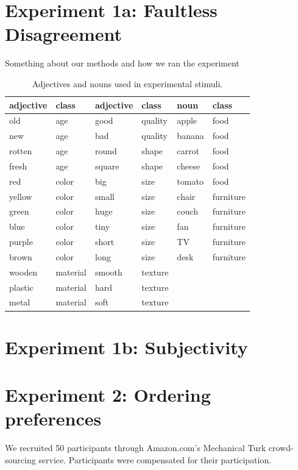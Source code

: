 \documentclass{pnastwo}
\begin{document}
\begin{article}
\begin{materials}
\section{Experiment 1a: Faultless Disagreement}
Something about our methods and how we ran the experiment
\begin{table}[h]
	\caption{Adjectives and nouns used in experimental stimuli.}
	\begin{tabular}{@{\vrule height 10.5pt depth2pt  width0pt}llllll}
	\textbf{adjective}	&	\textbf{class}	&	\textbf{adjective}	&	\textbf{class}	&	\textbf{noun}	&	\textbf{class}	\\ \hline
old	&	age	&	good	&	quality	&	apple	&	food	\\
new	&	age	&	bad	&	quality	&	banana	&	food	\\
rotten	&	age	&	round	&	shape	&	carrot	&	food	\\
fresh	&	age	&	square	&	shape	&	cheese	&	food	\\
red	&	color	&	big	&	size	&	tomato	&	food	\\
yellow	&	color	&	small	&	size	&	chair	&	furniture	\\
green	&	color	&	huge	&	size	&	couch	&	furniture	\\
blue	&	color	&	tiny	&	size	&	fan	&	furniture	\\
purple	&	color	&	short	&	size	&	TV	&	furniture	\\
brown	&	color	&	long	&	size	&	desk	&	furniture	\\
wooden	&	material	&	smooth	&	texture	\\				
plastic	&	material	&	hard	&	texture	\\				
metal	&	material	&	soft	&	texture	\\													
	\end{tabular} \label{stim-table}
\end{table}

\section{Experiment 1b: Subjectivity}

\section{Experiment 2: Ordering preferences}
We recruited 50 participants through Amazon.com's Mechanical Turk crowd-sourcing service. Participants were compensated for their participation.


\end{materials}
\end{article}
\end{document}
